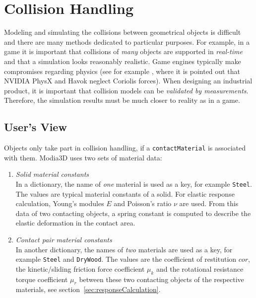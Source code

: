 
\section{Collision Handling}\label{sec:collHandling}

Modeling and simulating the collisions between geometrical objects is difficult and there are many
methods dedicated to particular purposes. For example, in a game it is important that  
collisions of \emph{many} objects are supported in \emph{real-time} and that a simulation looks 
reasonably realistic. Game engines typically make compromises regarding physics (see for
example \cite{Erez2015}, where it is pointed out that NVIDIA PhysX and Havok neglect
Coriolis forces).
When designing an industrial product, it is important that collision models can be \emph{validated by measurements}. Therefore, the simulation results must
be much closer to reality as in a game.



\subsection{User's View}

Objects only take part in collision handling, if a \texttt{contactMaterial} is
associated with them. Modia3D uses two sets of material data:

\begin{enumerate}
\item \emph{Solid material constants}\\
      In a dictionary, the name of \emph{one} material is used as a key, for example \texttt{Steel}. 
      The values are typical material constants of a solid. For elastic response calculation,
      Young's modules $E$ and Poisson's ratio $\nu$ are used. From this data of two contacting
      objects, a spring constant is computed to describe the elastic deformation in the contact area.

\item \emph{Contact pair material constants}\\
      In another dictionary, the names of \emph{two} materials are used as a key, for example \texttt{Steel} 
      and \texttt{DryWood}. The values are the coefficient of restitution $cor$, 
      the kinetic/sliding friction force coefficient $\mu_k$ and the 
      rotational resistance torque coefficient $\mu_r$ between these two contacting
      objects of the respective materials, see section~\ref{sec:responseCalculation}.
\end{enumerate}  

